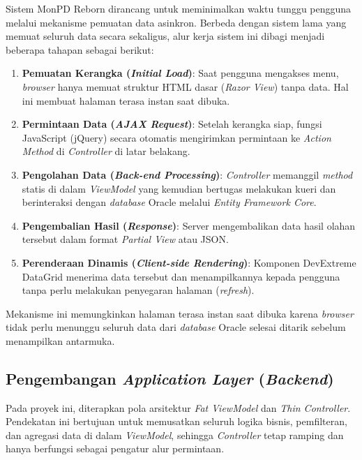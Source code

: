 Sistem MonPD Reborn dirancang untuk meminimalkan waktu tunggu pengguna melalui mekanisme pemuatan data asinkron. Berbeda dengan sistem lama yang memuat seluruh data secara sekaligus, alur kerja sistem ini dibagi menjadi beberapa tahapan sebagai berikut:
\begin{enumerate}
    \item \textbf{Pemuatan Kerangka (\emph{Initial Load})}: Saat pengguna mengakses menu, \emph{browser} hanya memuat struktur HTML dasar (\emph{Razor View}) tanpa data. Hal ini membuat halaman terasa instan saat dibuka.
    \item \textbf{Permintaan Data (\emph{AJAX Request})}: Setelah kerangka siap, fungsi JavaScript (jQuery) secara otomatis mengirimkan permintaan ke \emph{Action Method} di \emph{Controller} di latar belakang.
    \item \textbf{Pengolahan Data (\emph{Back-end Processing})}: \emph{Controller} memanggil \emph{method} statis di dalam \emph{ViewModel} yang kemudian bertugas melakukan kueri dan berinteraksi dengan \emph{database} Oracle melalui \emph{Entity Framework Core}.
    \item \textbf{Pengembalian Hasil (\emph{Response})}: Server mengembalikan data hasil olahan tersebut dalam format \emph{Partial View} atau JSON.
    \item \textbf{Perenderaan Dinamis (\emph{Client-side Rendering})}: Komponen DevExtreme DataGrid menerima data tersebut dan menampilkannya kepada pengguna tanpa perlu melakukan penyegaran halaman (\emph{refresh}).
\end{enumerate}

Mekanisme ini memungkinkan halaman terasa instan saat dibuka karena \emph{browser} tidak perlu menunggu seluruh data dari \emph{database} Oracle selesai ditarik sebelum menampilkan antarmuka.

\subsection{Pengembangan \emph{Application Layer} (\emph{Backend})}
Pada proyek ini, diterapkan pola arsitektur \emph{Fat ViewModel} dan \emph{Thin Controller}. Pendekatan ini bertujuan untuk memusatkan seluruh logika bisnis, pemfilteran, dan agregasi data di dalam \emph{ViewModel}, sehingga \emph{Controller} tetap ramping dan hanya berfungsi sebagai pengatur alur permintaan.

